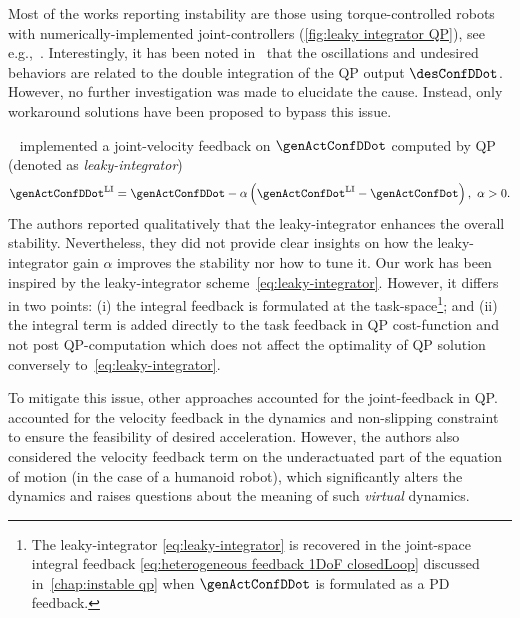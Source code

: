 Most of the works reporting instability are those using torque-controlled robots with numerically-implemented joint-controllers (\cref{fig:leaky integrator QP}), see e.g.,~\cite{feng2015journalOfFieldRobotics,johnson2015journalOfFieldRobotics,dedonato2017frontiers,koolen2016ijhr}. Interestingly, it has been noted in~\cite{feng2015journalOfFieldRobotics} that the oscillations and undesired behaviors are related to the double integration of the QP output $\desConfDDot$. However, no further investigation was made to elucidate the cause. 
Instead, only workaround solutions have been proposed to bypass this issue.

~\cite{hopkins2015icra} implemented a joint-velocity feedback on $\genActConfDDot$ computed by QP (denoted as \emph{leaky-integrator})
\begin{equation}\label{eq:leaky-integrator}
	\genActConfDDot^{\rm LI} = \genActConfDDot - \alpha \left(\genActConfDot^{\rm LI} - \genActConfDot\right) , \ \alpha>0.   
\end{equation}
 The authors reported qualitatively that the leaky-integrator enhances the overall stability. Nevertheless, they did not provide clear insights on how the leaky-integrator gain $\alpha$ improves the stability nor how to tune it. Our work has been inspired by the leaky-integrator scheme~\eqref{eq:leaky-integrator}. However, it differs in two points: (i) the integral feedback is formulated at the task-space\footnote{The leaky-integrator \cref{eq:leaky-integrator} is recovered in the joint-space integral feedback \cref{eq:heterogeneous feedback 1DoF closedLoop} discussed in~\cref{chap:instable qp} when $\genActConfDDot$ is formulated as a PD feedback.}; and (ii) the integral term is added directly to the task feedback in QP cost-function and not post QP-computation which does not affect the optimality of QP solution conversely to~\cref{eq:leaky-integrator}. 
 
 To mitigate this issue, other approaches accounted for the joint-feedback in QP.~\cite{cisneros2018iros} accounted for the velocity feedback in the dynamics and non-slipping constraint to ensure the feasibility of desired acceleration. However, the authors also considered the velocity feedback term on the underactuated part of the equation of motion (in the case of a humanoid robot), which significantly alters the dynamics and raises questions about the meaning of such \emph{virtual} dynamics.
 
